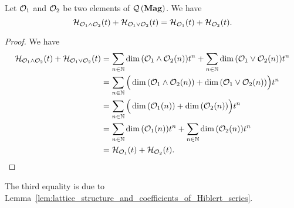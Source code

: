 \begin{Theorem} \label{thm:Grassmann_formula_for__Hilbert_series_of_QMag}
  Let $\mathcal{O}_1$ and $\mathcal{O}_2$ be two elements of $\mathcal{Q}\left(\mathbf{Mag}\right)$. We have
  \begin{equation} \label{equ:lattice_structure_and_Hiblert_series}
    \mathcal{H}_{\mathcal{O}_1\wedge\mathcal{O}_2}(t)+\mathcal{H}_{\mathcal{O}_1\vee\mathcal{O}_2}(t)=\mathcal{H}_{\mathcal{O}_1}(t)+\mathcal{H}_{\mathcal{O}_2}(t).
    \end{equation}
  \end{Theorem}

\begin{proof}
  We have
  \[\begin{split}
  \mathcal{H}_{\mathcal{O}_1\wedge\mathcal{O}_2}(t)+\mathcal{H}_{\mathcal{O}_1\vee\mathcal{O}_2}(t)&=\sum_{n\in\mathbb{N}}\dim{\left(\mathcal{O}_1\wedge\mathcal{O}_2(n)\right)}t^n+\sum_{n\in\mathbb{N}}\dim{\left(\mathcal{O}_1\vee\mathcal{O}_2(n)\right)}t^n\\
  &=\sum_{n\in\mathbb{N}}\Big(\dim{\left(\mathcal{O}_1\wedge\mathcal{O}_2(n)\right)}+\dim{\left(\mathcal{O}_1\vee\mathcal{O}_2(n)\right)}\Big)t^n\\
  &=\sum_{n\in\mathbb{N}}\Big(\dim{\left(\mathcal{O}_1(n)\right)}+\dim{\left(\mathcal{O}_2(n)\right)}\Big)t^n\\
  &=\sum_{n\in\mathbb{N}}\dim{\left(\mathcal{O}_1(n)\right)}t^n+\sum_{n\in\mathbb{N}}\dim{\left(\mathcal{O}_2(n)\right)}t^n\\
  &=\mathcal{H}_{\mathcal{O}_1}(t)+\mathcal{H}_{\mathcal{O}_2}(t).
  \end{split}\]
\end{proof}
The third equality is due to Lemma~\ref{lem:lattice_structure_and_coefficients_of_Hiblert_series}.

